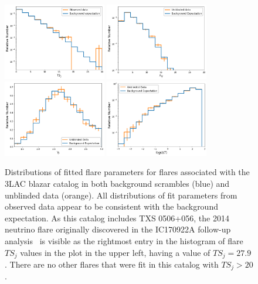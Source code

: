 \begin{figure}[h]
\centering
\includegraphics[width=0.4\textwidth]{figs/3lac_tsjs.png}
\includegraphics[width=0.4\textwidth]{figs/3lac_nss.png}
\includegraphics[width=0.4\textwidth]{figs/3lac_gammas.png}
\includegraphics[width=0.4\textwidth]{figs/3lac_dts.png}
\caption{Distributions of fitted flare parameters for flares associated with the 3LAC blazar catalog in both background scrambles (blue) and unblinded data (orange). All distributions of fit parameters from observed data appear to be consistent with the background expectation. As this catalog includes TXS 0506+056, the 2014 neutrino flare originally discovered in the IC170922A follow-up analysis~\cite{TXS_Archival} is visible as the rightmost entry in the histogram of flare $TS_j$ values in the plot in the upper left, having a value of $TS_j=27.9$. There are no other flares that were fit in this catalog with $TS_j>20$. }
\label{fig:3lacresults}
\end{figure}

